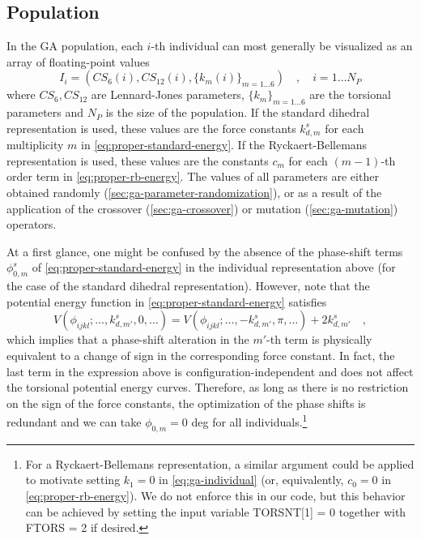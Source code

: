 \documentclass[10pt,a4paper,openany]{memoir}
\numberwithin{equation}{section}
\begin{document}
\subsection{Population}
\label{sec:ga-population}

In the GA population, each $i$-th individual can most generally be visualized as an
array of floating-point values
\begin{equation}
  \label{eq:ga-individual}
  I_i = (CS_6(i), CS_{12}(i), \{k_m(i)\}_{m=1\ldots 6}) \quad , \quad i = 1 \ldots N_P
\end{equation}
where $CS_6, CS_{12}$ are Lennard-Jones parameters, $\{k_m\}_{m=1\ldots 6}$ are the torsional parameters and $N_P$ is the size of the population.
If the standard dihedral representation is used, these values are the force constants $k_{d,m}^s$ for each multiplicity $m$ in \autoref{eq:proper-standard-energy}.
If the Ryckaert-Bellemans representation is used, these values are the constants $c_m$  for each $(m-1)$-th order term in \autoref{eq:proper-rb-energy}.
The values of all parameters are either obtained randomly (\autoref{sec:ga-parameter-randomization}), or as a result of the application of the crossover (\autoref{sec:ga-crossover}) or mutation (\autoref{sec:ga-mutation}) operators.

At a first glance, one might be confused by the absence of the phase-shift terms $\phi_{0,m}^s$ of \autoref{eq:proper-standard-energy} in the individual representation above (for the case of the standard dihedral representation).
However, note that the potential energy function in \autoref{eq:proper-standard-energy} satisfies
\begin{equation*}
  V(\phi_{ijkl}; \ldots,k_{d,m'}^s,0,\ldots) = V(\phi_{ijkl}; \ldots,-k_{d,m'}^s,\pi,\ldots) + 2k_{d,m'}^s\quad , 
\end{equation*}
which implies that a phase-shift alteration in the $m'$-th term is physically equivalent to a change of sign in the corresponding force constant.
In fact, the last term in the expression above is configuration-independent and does not affect the torsional potential energy curves.
Therefore, as long as there is no restriction on the sign of the force constants, the optimization of the phase shifts is redundant and we can take $\phi_{0,m} = 0$ deg for all individuals.\footnote{For a Ryckaert-Bellemans representation, a similar argument could be applied to motivate setting $k_1 = 0$ in \autoref{eq:ga-individual} (or, equivalently, $c_0 = 0$ in \autoref{eq:proper-rb-energy}).
  We do not enforce this in our code, but this behavior can be achieved by setting the input variable TORSNT[1] = 0 together with FTORS = 2 if desired.}
\end{document}
